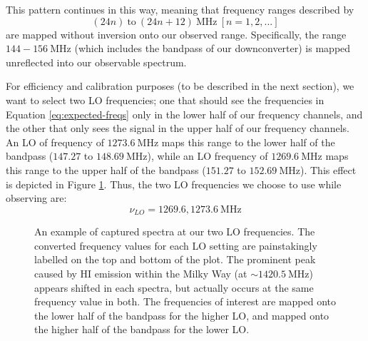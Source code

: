 \documentclass[12pt]{article}
\begin{document}
This pattern continues in this way, meaning that frequency ranges described by
\begin{equation}
(24n)\ \mathrm{to}\ (24n+12)\ \mathrm{MHz}\ [n = 1,2,...]
\end{equation}
are mapped without inversion onto our observed range. Specifically, the range $144-156\ \mathrm{MHz}$ (which includes the bandpass of our downconverter) is mapped unreflected into our observable spectrum.

For efficiency and calibration purposes (to be described in the next section), we want to select two LO frequencies; one that should see the frequencies in Equation \ref{eq:expected-freqs} only in the lower half of our frequency channels, and the other that only sees the signal in the upper half of our frequency channels.  An LO of frequency of $1273.6\ \mathrm{MHz}$ maps this range to the lower half of the bandpass ($147.27$ to $148.69\ \mathrm{MHz}$), while an LO frequency of $1269.6\ \mathrm{MHz}$ maps this range to the upper half of the bandpass ($151.27$ to $152.69\ \mathrm{MHz}$). This effect is depicted in Figure \ref{fig:lo}. Thus, the two LO frequencies we choose to use while observing are:
\begin{equation}
\nu_{LO} = 1269.6, 1273.6\ \mathrm{MHz} \label{eq:thelos}
\end{equation}

\begin{figure}[H]
\caption[SODUMB]{An example of captured spectra at our two LO frequencies. The converted frequency values for each LO setting are painstakingly labelled on the top and bottom of the plot. The prominent peak caused by HI emission within the Milky Way (at $\sim1420.5\ \mathrm{MHz}$) appears shifted in each spectra, but actually occurs at the same frequency value in both. The frequencies of interest are mapped onto the lower half of the bandpass for the higher LO, and mapped onto the higher half of the bandpass for the lower LO.
}
\label{fig:lo}
\end{figure}
\end{document}
